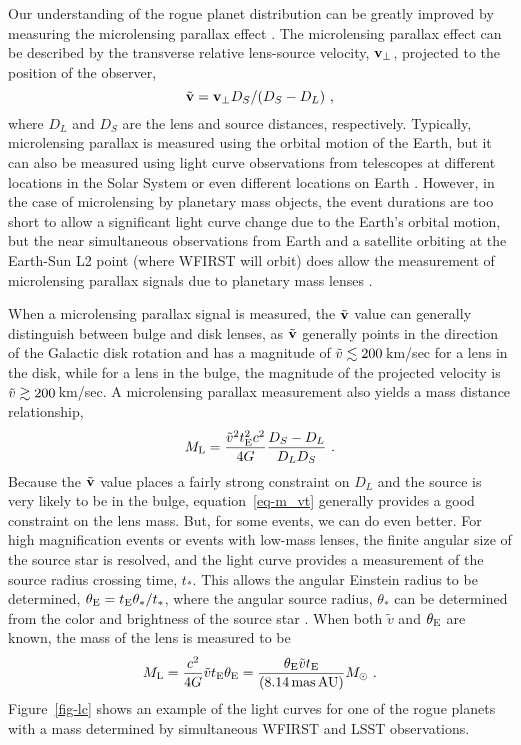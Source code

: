 Our understanding of the rogue planet distribution can be greatly improved
by measuring the microlensing parallax effect \citep{1992ApJ...392..442G,1995ApJ...454L.125A}.
The microlensing parallax effect can be described
by the transverse relative lens-source velocity, ${\bf v}_{\rm \perp}$, projected
to the position of the observer,
\begin{equation}
\tilde{\bf v} = {\bf v}_{\rm \perp} D_S/(D_S-D_L) \ , \label{eq-vp}
\end{equation}
where $D_L$ and $D_S$ are the lens and source distances, respectively.
Typically, microlensing parallax
is measured using the orbital motion of the Earth, but it can also be
measured using light curve observations from telescopes at different locations
in the Solar System \citep{2007ApJ...664..862D,2015ApJ...804...20C} or
even different locations on Earth \citep{2009ApJ...698L.147G}. However, in the
case of microlensing by planetary mass objects, the event durations are
too short to allow a significant light curve change due to the Earth's
orbital motion, but the near simultaneous observations from Earth and a
satellite orbiting at the Earth-Sun L2 point (where WFIRST will orbit) does
allow the measurement of microlensing parallax signals due to planetary mass
lenses \citep{2003ApJ...591L..53G}.

When a microlensing parallax signal is measured, the $\tilde{\bf v}$ value
can generally distinguish between bulge and disk lenses, as $\tilde{\bf v}$
generally points in the direction of the Galactic disk rotation and has
a magnitude of $\tilde{v} \lesssim 200\,$km/sec for a lens in the
disk, while for a lens in the bulge, the magnitude of the projected velocity
is $\tilde{v} \gtrsim 200\,$km/sec. A microlensing parallax measurement also
yields a mass distance relationship,
\begin{equation}
   M_{\rm L} = {\tilde{v}^2 t_{\rm E}^2 c^2 \over 4 G} {D_S-D_L \over D_L D_S} \ .
   \label{eq-m_vt}
\end{equation}
Because the $\tilde{\bf v}$ value places a fairly strong constraint
on $D_L$ and the source is very likely to be in the bulge, equation~\ref{eq-m_vt}
generally provides a good constraint on the lens mass. But, for some
events, we can do even better. For high magnification events or events
with low-mass lenses, the finite angular size of the source star is
resolved, and the light curve provides a measurement of the source
radius crossing time, $t_*$. This allows the angular Einstein radius
to be determined, $\theta_{\rm E} = t_{\rm E} \theta_*/t_*$, where the angular
source radius, $\theta_*$ can be determined from the color and brightness
of the source star \citep{2014AJ....147...47B}. When both $\tilde{v}$ and
$\theta_{\rm E}$ are known, the mass of the lens is measured to be
\begin{equation}
M_{\rm L} = {c^2\over 4G} \tilde{v} t_{\rm E} \theta_{\rm E} = {\theta_{\rm E}\tilde{v} t_{\rm E} \over (8.14\,{\rm mas\, AU})} M_{\odot} \ .
\label{eq-m}
\end{equation}
Figure~\ref{fig-lc} shows an example of the light curves for one of the
rogue planets with a mass determined by simultaneous WFIRST and LSST
observations.

